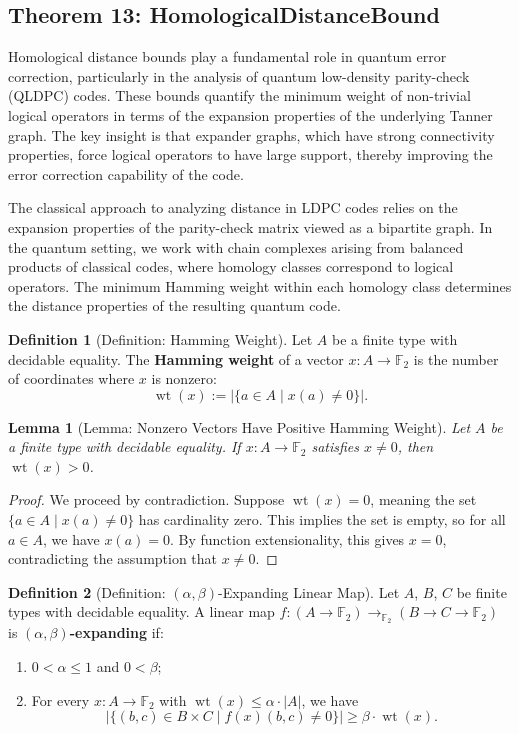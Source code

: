 \documentclass[11pt]{article}
\theoremstyle{plain}
\newtheorem*{lemma}{Lemma}
\theoremstyle{definition}
\newtheorem*{definition}{Definition}
\theoremstyle{remark}
\begin{document}
\vspace{1em}

\subsection{Theorem 13: HomologicalDistanceBound}

Homological distance bounds play a fundamental role in quantum error correction, particularly in the analysis of quantum low-density parity-check (QLDPC) codes. These bounds quantify the minimum weight of non-trivial logical operators in terms of the expansion properties of the underlying Tanner graph. The key insight is that expander graphs, which have strong connectivity properties, force logical operators to have large support, thereby improving the error correction capability of the code.

The classical approach to analyzing distance in LDPC codes relies on the expansion properties of the parity-check matrix viewed as a bipartite graph. In the quantum setting, we work with chain complexes arising from balanced products of classical codes, where homology classes correspond to logical operators. The minimum Hamming weight within each homology class determines the distance properties of the resulting quantum code.

\begin{definition}[Definition: Hamming Weight]
Let $A$ be a finite type with decidable equality. The \textbf{Hamming weight} of a vector $x : A \to \mathbb{F}_2$ is the number of coordinates where $x$ is nonzero:
\[
\operatorname{wt}(x) := \bigl|\{ a \in A \mid x(a) \neq 0 \}\bigr|.
\]
\end{definition}

\begin{lemma}[Lemma: Nonzero Vectors Have Positive Hamming Weight]
Let $A$ be a finite type with decidable equality. If $x : A \to \mathbb{F}_2$ satisfies $x \neq 0$, then $\operatorname{wt}(x) > 0$.
\end{lemma}

\begin{proof}
We proceed by contradiction. Suppose $\operatorname{wt}(x) = 0$, meaning the set $\{a \in A \mid x(a) \neq 0\}$ has cardinality zero. This implies the set is empty, so for all $a \in A$, we have $x(a) = 0$. By function extensionality, this gives $x = 0$, contradicting the assumption that $x \neq 0$.
\end{proof}

\begin{definition}[Definition: $(\alpha, \beta)$-Expanding Linear Map]
Let $A$, $B$, $C$ be finite types with decidable equality. A linear map $f : (A \to \mathbb{F}_2) \to_{\mathbb{F}_2} (B \to C \to \mathbb{F}_2)$ is \textbf{$(\alpha, \beta)$-expanding} if:
\begin{enumerate}
\item $0 < \alpha \leq 1$ and $0 < \beta$;
\item For every $x : A \to \mathbb{F}_2$ with $\operatorname{wt}(x) \leq \alpha \cdot |A|$, we have
\[
\bigl|\{(b,c) \in B \times C \mid f(x)(b,c) \neq 0\}\bigr| \geq \beta \cdot \operatorname{wt}(x).
\]
\end{enumerate}
\end{definition}
\end{document}
